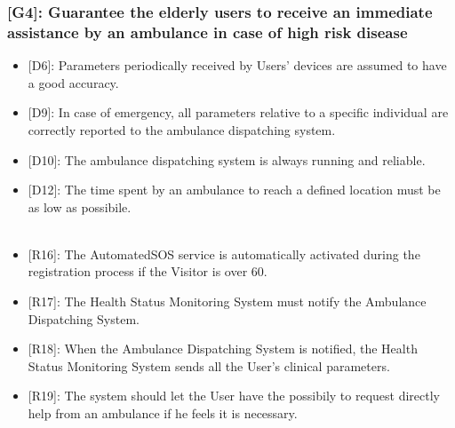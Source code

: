 \documentclass[12pt,a4paper]{article}
\begin{document}
		\subsubsection*{{[}{G4}{]}: Guarantee the elderly users to receive an immediate assistance by an ambulance in case of high risk disease}
			\begin{itemize}
				\begin{itemize}
					\item {[D6]}: Parameters periodically received by Users' devices are assumed to have a good accuracy. 
					\item {[D9]}: In case of emergency, all parameters relative to a specific individual are correctly reported to the ambulance dispatching system.
					\item {[D10]}: The ambulance dispatching system is always running and reliable.
					\item {[D12]}: The time spent by an ambulance to reach a defined location must be as low as possibile. 
					\\\\
					\item {[R16]}: The AutomatedSOS service is automatically activated during the registration process if the Visitor is over 60.
					\item {[R17]}: The Health Status Monitoring System must notify the Ambulance Dispatching System. 
					\item {[R18]}: When the Ambulance Dispatching System is notified, the Health Status Monitoring System sends all the User's clinical parameters.
					\item {[R19]}: The system should let the User have the possibily to request directly help from an ambulance if he feels it is necessary.
				\end{itemize}
			\end{itemize}
\end{document}
